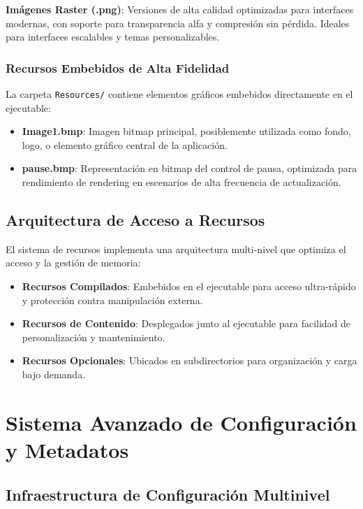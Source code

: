 \documentclass[a4paper]{article}
\begin{document}
\textbf{Imágenes Raster (.png)}:
Versiones de alta calidad optimizadas para interfaces modernas, con soporte para transparencia alfa y compresión sin pérdida. Ideales para interfaces escalables y temas personalizables.

\subsubsection{Recursos Embebidos de Alta Fidelidad}

La carpeta \texttt{Resources/} contiene elementos gráficos embebidos directamente en el ejecutable:

\begin{itemize}
\item \textbf{Image1.bmp}: Imagen bitmap principal, posiblemente utilizada como fondo, logo, o elemento gráfico central de la aplicación.

\item \textbf{pause.bmp}: Representación en bitmap del control de pausa, optimizada para rendimiento de rendering en escenarios de alta frecuencia de actualización.
\end{itemize}

\subsection{Arquitectura de Acceso a Recursos}

El sistema de recursos implementa una arquitectura multi-nivel que optimiza el acceso y la gestión de memoria:

\begin{itemize}
\item \textbf{Recursos Compilados}: Embebidos en el ejecutable para acceso ultra-rápido y protección contra manipulación externa.

\item \textbf{Recursos de Contenido}: Desplegados junto al ejecutable para facilidad de personalización y mantenimiento.

\item \textbf{Recursos Opcionales}: Ubicados en subdirectorios para organización y carga bajo demanda.
\end{itemize}

\section{Sistema Avanzado de Configuración y Metadatos}

\subsection{Infraestructura de Configuración Multinivel}
\end{document}
